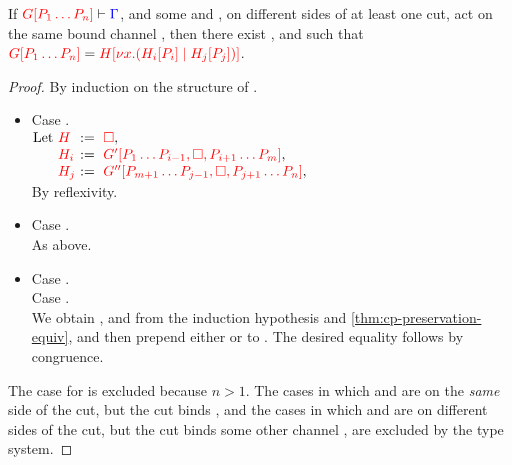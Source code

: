 \begin{lemmaB}\label{thm:cp-progress-beta}
  If $\seq[{ \cpPlug{G}{P_1 \dots P_n} }]{ \Gamma }$, and some  and
  , on different sides of at least one cut, act on the same bound
  channel , then there exist ,  and  such that 
  \(
  \tm{\cpPlug{G}{P_1 \dots P_n}} =
  \tm{\cpPlug{H}{\cpCut{x}{\cpPlug{H_i}{P_i}}{\cpPlug{H_j}{P_j}}}}
  \).
\end{lemmaB}
\begin{proof}
  By induction on the structure of .
  \begin{itemize}
  \item
    Case . 
    \\
    \(\arraycolsep=0pt\begin{array}[t]{lll}
      \text{Let}&\ \tm{H}  &\ :=\ \tm{\Box}, \\
                &\ \tm{H_i}&\ :=\ \tm{\cpPlug{G'}{P_1\dots P_{i-1},\Box,P_{i+1}\dots P_m}}, \\
                &\ \tm{H_j}&\ :=\ \tm{\cpPlug{G''}{P_{m+1}\dots P_{j-1},\Box,P_{j+1}\dots P_n}},
    \end{array}\)
    \\[1ex]
    By reflexivity.
  \item
    Case .
    \\
    As above.
  \item
    Case . \\
    Case .
    \\
    We obtain ,  and  from the induction hypothesis and
    \cref{thm:cp-preservation-equiv}, and then prepend either
     or
     to .
    The desired equality follows by congruence.
  \end{itemize}
  The case for \tm{\Box} is excluded because $n > 1$.
  The cases in which  and  are on the \emph{same} side of the
  cut, but the cut binds , and the cases in which  and 
  are on different sides of the cut, but the cut binds some other channel
  , are excluded by the type system.
\end{proof}
